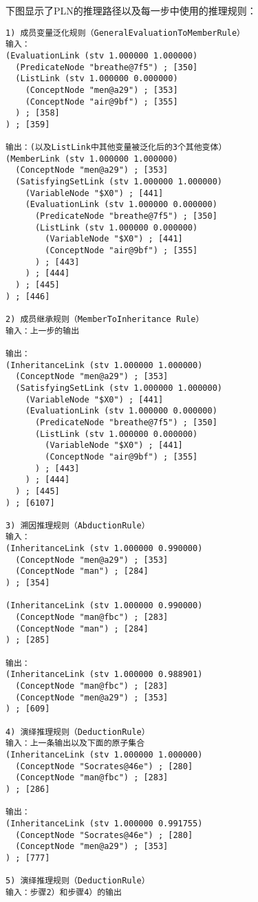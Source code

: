 下图显示了PLN的推理路径以及每一步中使用的推理规则：

{\tt\begin{small}\begin{lstlisting}
1) 成员变量泛化规则（GeneralEvaluationToMemberRule）
输入：
(EvaluationLink (stv 1.000000 1.000000)
  (PredicateNode "breathe@7f5") ; [350]
  (ListLink (stv 1.000000 0.000000)
    (ConceptNode "men@a29") ; [353]
    (ConceptNode "air@9bf") ; [355]
  ) ; [358]
) ; [359]

输出：(以及ListLink中其他变量被泛化后的3个其他变体）
(MemberLink (stv 1.000000 1.000000)
  (ConceptNode "men@a29") ; [353]
  (SatisfyingSetLink (stv 1.000000 1.000000)
    (VariableNode "$X0") ; [441]
    (EvaluationLink (stv 1.000000 0.000000)
      (PredicateNode "breathe@7f5") ; [350]
      (ListLink (stv 1.000000 0.000000)
        (VariableNode "$X0") ; [441]
        (ConceptNode "air@9bf") ; [355]
      ) ; [443]
    ) ; [444]
  ) ; [445]
) ; [446]

2) 成员继承规则（MemberToInheritance Rule）
输入：上一步的输出

输出：
(InheritanceLink (stv 1.000000 1.000000)
  (ConceptNode "men@a29") ; [353]
  (SatisfyingSetLink (stv 1.000000 1.000000)
    (VariableNode "$X0") ; [441]
    (EvaluationLink (stv 1.000000 0.000000)
      (PredicateNode "breathe@7f5") ; [350]
      (ListLink (stv 1.000000 0.000000)
        (VariableNode "$X0") ; [441]
        (ConceptNode "air@9bf") ; [355]
      ) ; [443]
    ) ; [444]
  ) ; [445]
) ; [6107]

3) 溯因推理规则（AbductionRule）
输入：
(InheritanceLink (stv 1.000000 0.990000)
  (ConceptNode "men@a29") ; [353]
  (ConceptNode "man") ; [284]
) ; [354]

(InheritanceLink (stv 1.000000 0.990000)
  (ConceptNode "man@fbc") ; [283]
  (ConceptNode "man") ; [284]
) ; [285]

输出：
(InheritanceLink (stv 1.000000 0.988901)
  (ConceptNode "man@fbc") ; [283]
  (ConceptNode "men@a29") ; [353]
) ; [609]

4) 演绎推理规则（DeductionRule）
输入：上一条输出以及下面的原子集合
(InheritanceLink (stv 1.000000 1.000000)
  (ConceptNode "Socrates@46e") ; [280]
  (ConceptNode "man@fbc") ; [283]
) ; [286]

输出：
(InheritanceLink (stv 1.000000 0.991755)
  (ConceptNode "Socrates@46e") ; [280]
  (ConceptNode "men@a29") ; [353]
) ; [777]

5) 演绎推理规则（DeductionRule）
输入：步骤2）和步骤4）的输出


\end{lstlisting}
\end{small}}
